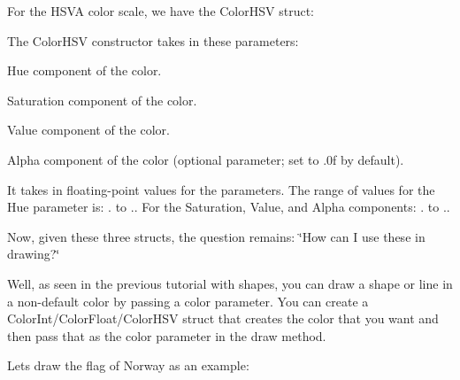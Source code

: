 For the H\+S\+VA color scale, we have the {\ttfamily Color\+H\+SV} struct\+:


\begin{DoxyCode}{0}
\end{DoxyCode}


The {\ttfamily Color\+H\+SV} constructor takes in these parameters\+:


\begin{DoxyItemize}
\item Hue component of the color.
\item Saturation component of the color.
\item Value component of the color.
\item Alpha component of the color (optional parameter; set to {.\+0f} by default).
\end{DoxyItemize}

It takes in floating-\/point values for the parameters. The range of values for the Hue parameter is\+: {.} to {.}. For the Saturation, Value, and Alpha components\+: {.} to {.}.

Now, given these three structs, the question remains\+: \char`\"{}\+How can I use these in drawing?\char`\"{}

Well, as seen in the previous tutorial with shapes, you can draw a shape or line in a non-\/default color by passing a color parameter. You can create a {\ttfamily Color\+Int/\+Color\+Float/\+Color\+H\+SV} struct that creates the color that you want and then pass that as the color parameter in the draw method.

Let\textquotesingle{}s draw the flag of Norway as an example\+:


